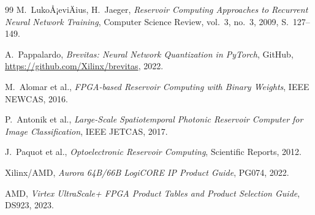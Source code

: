﻿\documentclass[a4paper,12pt]{article}
\theoremstyle{definition}
\begin{document}
\begin{thebibliography}{99}
  M.~LukoÅ¡eviÄius, H.~Jaeger,
  \textit{Reservoir Computing Approaches to Recurrent Neural Network Training},
  Computer Science Review, vol.~3, no.~3, 2009, S.~127--149.

  A.~Pappalardo,
  \textit{Brevitas: Neural Network Quantization in PyTorch},
  GitHub, \url{https://github.com/Xilinx/brevitas}, 2022.

  M.~Alomar et al.,
  \textit{FPGA-based Reservoir Computing with Binary Weights},
  IEEE NEWCAS, 2016.

  P.~Antonik et al.,
  \textit{Large-Scale Spatiotemporal Photonic Reservoir Computer for Image Classification},
  IEEE JETCAS, 2017.

  J.~Paquot et al.,
  \textit{Optoelectronic Reservoir Computing},
  Scientific Reports, 2012.

  Xilinx/AMD,
  \textit{Aurora 64B/66B LogiCORE IP Product Guide},
  PG074, 2022.

  AMD,
  \textit{Virtex UltraScale+ FPGA Product Tables and Product Selection Guide},
  DS923, 2023.

\end{thebibliography}
\end{document}
